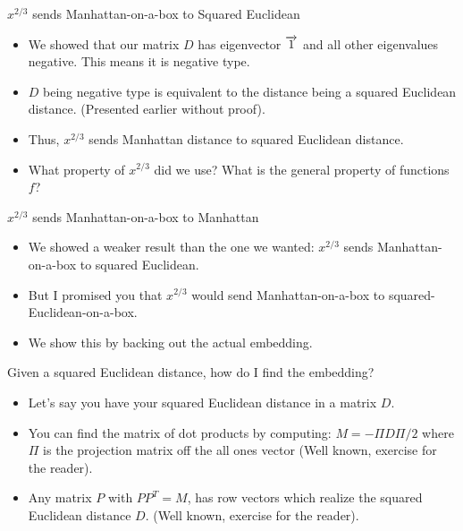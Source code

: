  \begin{frame}{$x^{2/3}$ sends Manhattan-on-a-box to Squared Euclidean}
   \begin{itemize}[<+->]
   \item We showed that our matrix $D$ has eigenvector $\overrightarrow{1}$ and all
   other eigenvalues negative. This means it is negative type.
   \item $D$ being negative type is equivalent to the distance being a
   squared Euclidean distance. (Presented earlier without proof).
   \item Thus, $x^{2/3}$ sends Manhattan distance to squared Euclidean
   distance.
   \item What property of $x^{2/3}$ did we use? What is the general
   property of functions $f$?
   \end{itemize}
 \end{frame}
 
 \begin{frame}{$x^{2/3}$ sends Manhattan-on-a-box to Manhattan}
   \begin{itemize}[<+->]
   \item We showed a weaker result than the one we wanted: $x^{2/3}$
   sends Manhattan-on-a-box to squared Euclidean.
   \item But I promised you that $x^{2/3}$ would send Manhattan-on-a-box
   to squared-Euclidean-on-a-box.
   \item We show this by backing out the actual embedding.
   \end{itemize}
 \end{frame}
 
 \begin{frame}{Given a squared Euclidean distance, how do I find the
   embedding?}
   \begin{itemize}[<+->]
   \item Let's say you have your squared Euclidean distance in a matrix
   $D$.
   \item You can find the matrix of dot products by computing: 
   $ M = -\Pi D \Pi / 2$ where $\Pi$ is the projection matrix off the all
   ones vector (Well known, exercise for the reader).
   \item Any matrix $P$ with $PP^T = M$, has row vectors which realize
   the squared Euclidean distance $D$. (Well known, exercise for the
       reader).
   \end{itemize}
 \end{frame}
 

